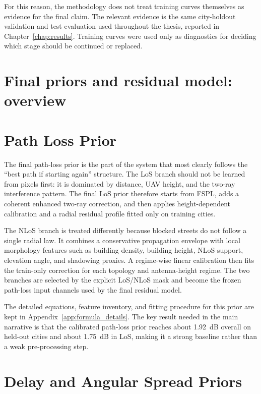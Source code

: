For this reason, the methodology does not treat training curves themselves as
evidence for the final claim. The relevant evidence is the same city-holdout
validation and test evaluation used throughout the thesis, reported in
Chapter~\ref{chap:results}. Training curves were used only as diagnostics for
deciding which stage should be continued or replaced.



\section{Final priors and residual model: overview}
\label{sec:priors_overview}



\section{Path Loss Prior}
\label{sec:try78_detail}

The final path-loss prior is the part of the system that most clearly follows
the ``best path if starting again'' structure. The LoS branch should not be
learned from pixels first: it is dominated by distance, UAV height, and the
two-ray interference pattern. The final LoS prior therefore starts from FSPL,
adds a coherent enhanced two-ray correction, and then applies height-dependent
calibration and a radial residual profile fitted only on training cities.

The NLoS branch is treated differently because blocked streets do not follow a
single radial law. It combines a conservative propagation envelope with local
morphology features such as building density, building height, NLoS support,
elevation angle, and shadowing proxies. A regime-wise linear calibration then
fits the train-only correction for each topology and antenna-height regime. The
two branches are selected by the explicit LoS/NLoS mask and become the frozen
path-loss input channels used by the final residual model.

The detailed equations, feature inventory, and fitting procedure for this prior
are kept in Appendix~\ref{app:formula_details}. The key result needed in the
main narrative is that the calibrated path-loss prior reaches about
\SI{1.92}{dB} overall on held-out cities and about \SI{1.75}{dB} in LoS,
making it a strong baseline rather than a weak pre-processing step.

\section{Delay and Angular Spread Priors}
\label{sec:try79_detail}

